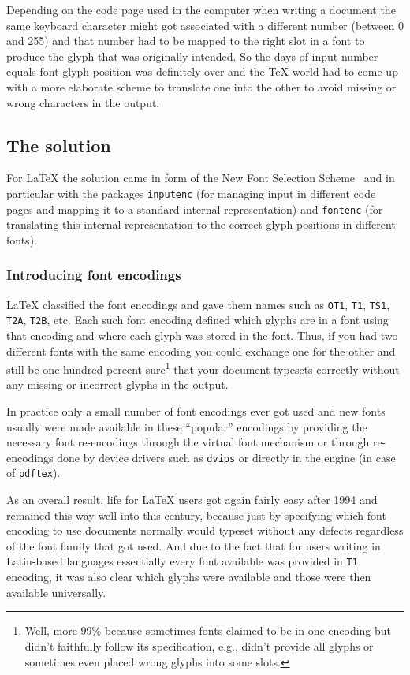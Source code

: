 \documentclass{ltugboat}
\newcommand\LPack[1]{\texttt{#1}}
\newcommand\Prog[1]{\texttt{#1}}
\begin{document}
Depending on the code page used in the computer when writing a
document the same keyboard character might got associated with a
different number (between 0 and 255) and that number had to be mapped
to the right slot in a font to produce the glyph that was originally
intended. So the days of input number equals font glyph position was
definitely over and the \TeX{} world had to come up with a more
elaborate scheme to translate one into the other to avoid missing or
wrong characters in the output.


\subsection{The \LaTeXe{} solution}

For \LaTeX{} the solution came in form of the New Font Selection
Scheme~\cite{Mittelbach:TB11-1-91} and in particular with the packages
\LPack{inputenc} (for managing input in different code pages and
mapping it to a standard internal
representation) and \LPack{fontenc}
(for translating this internal representation to the correct glyph
positions in different fonts).


\subsubsection{Introducing font encodings}

\LaTeX{} classified the font encodings and gave them names such as
\texttt{OT1}, \texttt{T1}, \texttt{TS1}, \texttt{T2A}, \texttt{T2B},
etc. Each such font encoding defined which glyphs are in a font using
that encoding and where each glyph was stored in the font. Thus, if
you had two different fonts with the same encoding you could exchange
one for the other and still be one hundred percent sure\footnote{Well,
  more 99\% because sometimes fonts claimed to be in one encoding but
  didn't faithfully follow its specification, e.g., didn't provide all
  glyphs or sometimes even placed wrong glyphs into some slots.}  that
your document  typesets correctly without any missing or
incorrect glyphs in the output.

In practice only a small number of font encodings ever got used and
new fonts usually were made available in these ``popular'' encodings
by providing the necessary font re-encodings through the virtual font
mechanism or through re-encodings done by device drivers such as
\Prog{dvips} or directly in the engine (in case of \Prog{pdftex}).

As an overall result, life for \LaTeX{} users got again fairly easy after
1994 and remained this way well into this century, because just by
specifying which font encoding to use documents normally would typeset
without any defects regardless of the font family that got used. And
due to the fact that for users writing in Latin-based languages
essentially every font available was provided in \texttt{T1} encoding,
it was also clear which glyphs were available and those were then
available universally.
\end{document}

